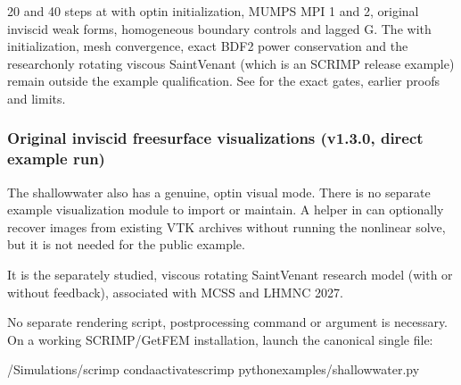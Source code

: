 \documentclass[letterpaper,10pt,english]{sphinxmanual}
\begin{document}
\sphinxAtStartPar
{} 20 and 40 steps at
 with opt\sphinxhyphen{}in
 initialization, MUMPS
MPI 1 and 2, original inviscid weak forms,
homogeneous boundary controls and lagged G.
The   with 
initialization, mesh convergence,
exact BDF2 power conservation and
the research\sphinxhyphen{}only rotating viscous
Saint\textendash{}Venant (which is  an SCRIMP
release example) remain outside
the example qualification. See
for the exact gates, earlier proofs and limits.


\subsubsection{Original inviscid free\sphinxhyphen{}surface visualizations (v1.3.0, direct example run)}
\label{\detokenize{examples/shallow_water:original-inviscid-free-surface-visualizations-v1-3-0-direct-example-run}}
\sphinxAtStartPar
The shallow\sphinxhyphen{}water  also has a genuine, opt\sphinxhyphen{}in visual
mode.  There is no separate
example visualization module to import or maintain. A helper in
 can optionally recover images from existing VTK
archives without running the nonlinear solve, but it is not needed
for the public example.

\sphinxAtStartPar
It is  the separately studied, viscous rotating
Saint\textendash{}Venant research model (with or without feedback),
associated with MCSS and LHMNC 2027.

\sphinxAtStartPar
{} No separate rendering script, postprocessing command or
 argument is necessary. On a working SCRIMP/GetFEM
installation, launch the canonical single file:

\begin{sphinxVerbatim}[commandchars=\\\{\}]
\PYGZti{}/Simulations/scrimp
condaactivatescrimp
pythonexamples/shallow\PYGZus{}water.py
\end{sphinxVerbatim}
\end{document}
